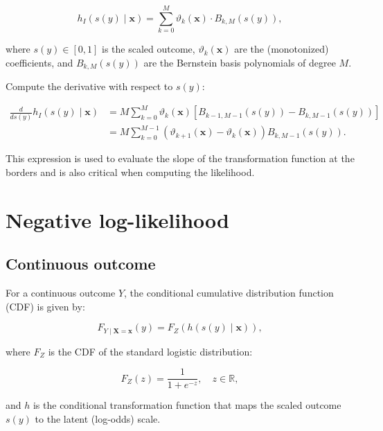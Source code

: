 \begin{equation*}
h_I(s(y) \mid \mathbf{x}) = \sum_{k=0}^{M} \vartheta_k(\mathbf{x}) \cdot B_{k, M}(s(y)),
\end{equation*}

where \( s(y) \in [0, 1] \) is the scaled outcome, \( \vartheta_k(\mathbf{x}) \) are the (monotonized) coefficients, and \( B_{k, M}(s(y)) \) are the Bernstein basis polynomials of degree \( M \).

Compute the derivative with respect to \( s(y) \):

\begin{align}
\frac{d}{ds(y)} h_I(s(y) \mid \mathbf{x}) 
&= M \sum_{k=0}^{M} \vartheta_k(\mathbf{x}) \left[ B_{k - 1, M - 1}(s(y)) - B_{k, M - 1}(s(y)) \right] \nonumber \\
&= M \sum_{k=0}^{M-1}  \left( \vartheta_{k+1}(\mathbf{x}) - \vartheta_k(\mathbf{x}) \right) B_{k, M - 1}(s(y)).
\label{eq:bernstein_derivative}
\end{align}

This expression is used to evaluate the slope of the transformation function at the borders and is also critical when computing the likelihood.






\section{Negative log-likelihood} \label{sec:nll}

\subsection{Continuous outcome} \label{sec:cont}

For a continuous outcome $Y$, the conditional cumulative distribution function (CDF) is given by:

\begin{equation*}
F_{Y \mid \mathbf{X} = \mathbf{x}}(y) = F_Z(h(s(y) \mid \mathbf{x})),
\end{equation*}

where $F_Z$ is the CDF of the standard logistic distribution:

\begin{equation*}
F_Z(z) = \frac{1}{1 + e^{-z}}, \quad z \in \mathbb{R},
\end{equation*}

and $h$ is the conditional transformation function that maps the scaled outcome $s(y)$ to the latent (log-odds) scale.

